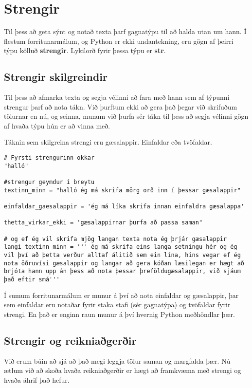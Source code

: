 \chapter{Strengir}\label{k:strengir}
Til þess að geta sýnt og notað texta þarf gagnatýpu til að halda utan um hann. Í flestum forritunarmálum, og Python er ekki undantekning, eru gögn af þeirri týpu kölluð \textbf{strengir}.
Lykilorð fyrir þessa týpu er \textbf{str}.

\section{Strengir skilgreindir}
Til þess að afmarka texta og segja vélinni að fara með hann sem af týpunni strengur þarf að nota tákn.
Við þurftum ekki að gera það þegar við skrifuðum tölurnar en nú, og seinna, munum við þurfa sér tákn til þess að segja vélinni gögn af hvaða týpu hún er að vinna með.

Táknin sem skilgreina strengi eru gæsalappir.
Einfaldar eða tvöfaldar.

\begin{lstlisting}[caption=Strengir skilgreindir]
# Fyrsti strengurinn okkar
"halló"

#strengur geymdur í breytu
textinn_minn = "halló ég má skrifa mörg orð inn í þessar gæsalappir"

einfaldar_gaesalappir = 'ég má líka skrifa innan einfaldra gæsalappa'

thetta_virkar_ekki = 'gæsalappirnar þurfa að passa saman" 

# og ef ég vil skrifa mjög langan texta nota ég þrjár gæsalappir
langi_textinn_minn = ''' ég má skrifa eins langa setningu hér og ég vil því að þetta verður alltaf álitið sem ein lína, hins vegar ef ég nota öðruvísi gæsalappir og langar að gera kóðan læsilegan er hægt að brjóta hann upp án þess að nota þessar þreföldugæsalappir, við sjáum það eftir smá'''
\end{lstlisting}

Í sumum forritunarmálum er munur á því að nota einfaldar og gæsalappir, þar sem einfaldar eru notaðar fyrir staka stafi (sér gagnatýpa) og tvöfaldar fyrir strengi.
En það er enginn raun munur á því hvernig Python meðhöndlar þær.

\section{Strengir og reikniaðgerðir}
Við erum búin að sjá að það megi leggja tölur saman og margfalda þær.
Nú ætlum við að skoða hvaða reikniaðgerðir er hægt að framkvæma með strengi og hvaða áhrif það hefur.


